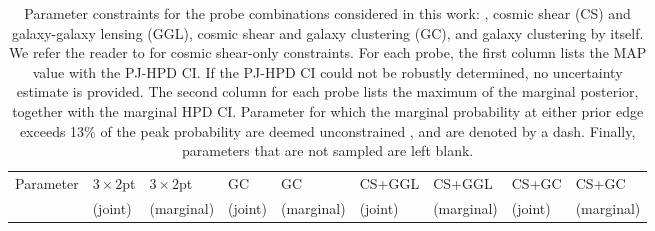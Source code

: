 \begin{landscape}
\begin{table}
\begin{center}
\caption{Parameter constraints for the probe combinations considered in this work: \tttp, cosmic shear (CS) and galaxy-galaxy lensing (GGL), cosmic shear and galaxy clustering (GC), and galaxy clustering by itself. 
We refer the reader to \citet{asgari/etal:inprep} for cosmic shear-only constraints. 
For each probe, the first column lists the MAP value with the PJ-HPD CI. 
If the PJ-HPD CI could not be robustly determined, no uncertainty estimate is provided. 
The second column for each probe lists the maximum of the marginal posterior, together with the marginal HPD CI. 
Parameter for which the marginal probability at either prior edge exceeds 13\% of the peak probability are deemed unconstrained \citep[see appendix A of][]{asgari/etal:inprep}, and are denoted by a dash. 
Finally, parameters that are not sampled are left blank.
\label{tab:fullparams}}
\begin{tabular}{lllllllll}
    \toprule
    Parameter    & $3\times2$pt & $3\times2$pt& GC & GC& CS+GGL & CS+GGL& CS+GC & CS+GC \\ 
             & (joint) & (marginal)& (joint) & (marginal)& (joint) & (marginal)& (joint) & (marginal) \\ 


\end{tabular}
\end{center}
\end{table}
\end{landscape}
